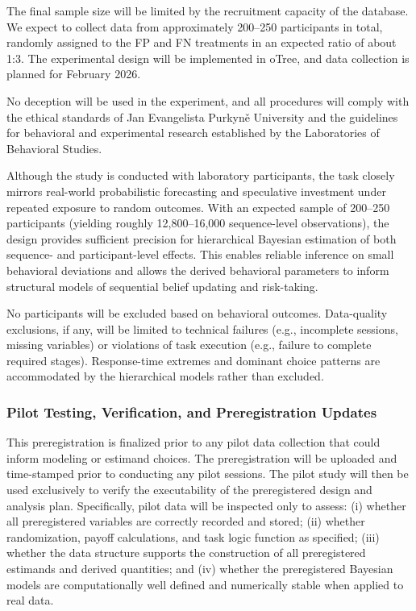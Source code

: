 \documentclass[11pt,a4paper]{article}
\numberwithin{equation}{section}
\begin{document}
The final sample size will be limited by the recruitment capacity of the database. We expect to collect data from approximately 200--250 participants in total, randomly assigned to the FP and FN treatments in an expected ratio of about 1:3. The experimental design will be implemented in oTree, and data collection is planned for February 2026.

No deception will be used in the experiment, and all procedures will comply with the ethical standards of Jan Evangelista Purkyně University and the guidelines for behavioral and experimental research established by the Laboratories of Behavioral Studies.

Although the study is conducted with laboratory participants, the task closely mirrors real-world probabilistic forecasting and speculative investment under repeated exposure to random outcomes. With an expected sample of 200--250 participants (yielding roughly 12{,}800--16{,}000 sequence-level observations), the design provides sufficient precision for hierarchical Bayesian estimation of both sequence- and participant-level effects. This enables reliable inference on small behavioral deviations and allows the derived behavioral parameters to inform structural models of sequential belief updating and risk-taking.

No participants will be excluded based on behavioral outcomes. Data-quality exclusions, if any, will be limited to technical failures (e.g., incomplete sessions, missing variables) or violations of task execution (e.g., failure to complete required stages). Response-time extremes and dominant choice patterns are accommodated by the hierarchical models rather than excluded.

\subsubsection{Pilot Testing, Verification, and Preregistration Updates}

This preregistration is finalized prior to any pilot data collection that could inform modeling or estimand choices. The preregistration will be uploaded and time-stamped prior to conducting any pilot sessions. The pilot study will then be used exclusively to verify the executability of the preregistered design and analysis plan. Specifically, pilot data will be inspected only to assess: (i) whether all preregistered variables are correctly recorded and stored; (ii) whether randomization, payoff calculations, and task logic function as specified; (iii) whether the data structure supports the construction of all preregistered estimands and derived quantities; and (iv) whether the preregistered Bayesian models are computationally well defined and numerically stable when applied to real data.
\end{document}
